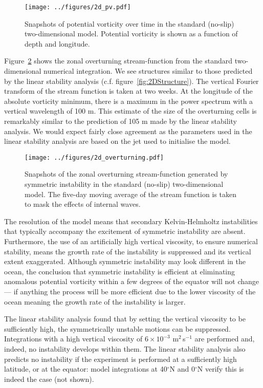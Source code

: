 \begin{figure}[t]
    \centering
    \texttt{[image: ../figures/2d\_pv.pdf]}
    \caption{Snapshots of potential vorticity over time in the standard (no-slip) two-dimensional model. Potential vorticity is shown as a function of depth and longitude.}
    \label{fig:2DPVSnapshotsStandard}
\end{figure}

Figure~\ref{fig:2DStandardOverturningStreamfunction} shows the zonal overturning stream-function from the standard two-dimensional numerical integration. We see structures similar to those predicted by the linear stability analysis (c.f. figure~\ref{fig:2DStructure}). The vertical Fourier transform of the stream function is taken at two weeks. At the longitude of the absolute vorticity minimum, there is a maximum in the power spectrum with a vertical wavelength of 100 m. This estimate of the size of the overturning cells is remarkably similar to the prediction of 105 m made by the linear stability analysis. We would expect fairly close agreement as the parameters used in the linear stability analysis are based on the jet used to initialise the model.

\begin{figure}[t]
    \centering
    \texttt{[image: ../figures/2d\_overturning.pdf]}
    \caption{Snapshots of the zonal overturning stream-function generated by symmetric instability in the standard (no-slip) two-dimensional model. The five-day moving average of the stream function is taken to mask the effects of internal waves.}
    \label{fig:2DStandardOverturningStreamfunction}
\end{figure}

The resolution of the model means that secondary Kelvin-Helmholtz instabilities that typically accompany the excitement of symmetric instability are absent. Furthermore, the use of an artificially high vertical viscosity, to ensure numerical stability,  means the growth rate of the instability is suppressed and its vertical extent exaggerated. Although symmetric instability may look different in the ocean, the conclusion that symmetric instability is efficient at eliminating anomalous potential vorticity within a few degrees of the equator will not change --- if anything the process will be more efficient due to the lower viscosity of the ocean meaning the growth rate of the instability is larger.

The linear stability analysis found that by setting the vertical viscosity to be sufficiently high, the symmetrically unstable motions can be suppressed. Integrations with a high vertical viscosity of $6 \times 10^{-3}$ m$^2$\,s$^{-1}$ are performed and, indeed, no instability develops within them. The linear stability analysis also predicts no instability if the experiment is performed at a sufficiently high latitude, or at the equator: model integrations at 40$^{\circ}$N and 0$^{\circ}$N verify this is indeed the case (not shown).

